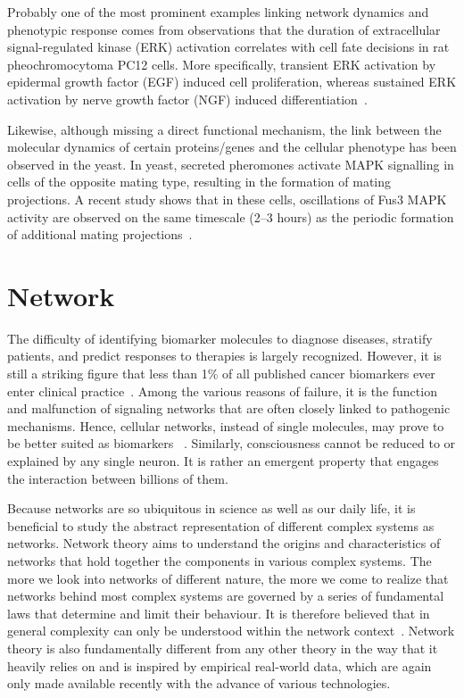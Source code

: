 Probably one of the most prominent examples linking network
dynamics and phenotypic response comes from observations 
that the duration of extracellular signal-regulated kinase (ERK) activation correlates with cell fate decisions in rat pheochromocytoma PC12 cells. More specifically, transient ERK activation by epidermal growth factor (EGF) induced cell proliferation, whereas sustained ERK activation by nerve growth factor (NGF) induced differentiation~\citep{Marshall1995a}.

Likewise, although missing a direct functional mechanism, the link between the molecular 
dynamics of certain proteins/genes and the cellular phenotype has been observed in the yeast.
In yeast, secreted pheromones activate MAPK signalling in cells of the opposite mating type, resulting in the formation of mating projections. A recent study shows that in these cells, oscillations of Fus3 MAPK activity are observed on the same timescale (2--3 hours) as the periodic formation of additional mating projections~\citep{Hilioti2008}. 

\section{Network}
The difficulty of identifying biomarker molecules to diagnose diseases, stratify patients, and predict responses to therapies is
largely recognized. However, it is still a striking figure
that less than 1\% of all published cancer biomarkers ever 
enter clinical practice~\citep{Kern2012}. Among the various
reasons of failure, it is the function and malfunction of signaling networks that are often closely linked to pathogenic mechanisms. Hence, cellular networks, instead of single
molecules, may prove to be better suited as biomarkers~%
\citep{Barabasi2011,Chuang2007,Chu2008}.
Similarly, consciousness cannot be reduced to or explained by any single 
neuron. It is rather an emergent property that engages 
the interaction between billions of them. 

Because networks are so ubiquitous
in science as well as our daily life, it is beneficial to
study the abstract representation of different complex 
systems as networks. Network theory aims to understand the origins and characteristics of networks that hold together the components in various complex systems. The more we look
into networks of different nature, the more we come to 
realize that networks behind most complex systems are governed by a series of fundamental laws that determine and limit their behaviour. 
It is therefore believed that in general complexity can only be understood within the
network context~\citep{Barabasi2012}. 
Network theory is also fundamentally different
from any other theory in the way that 
it heavily relies on and is inspired by
empirical real-world data, which are again only made 
available recently with the advance of various technologies.
 
